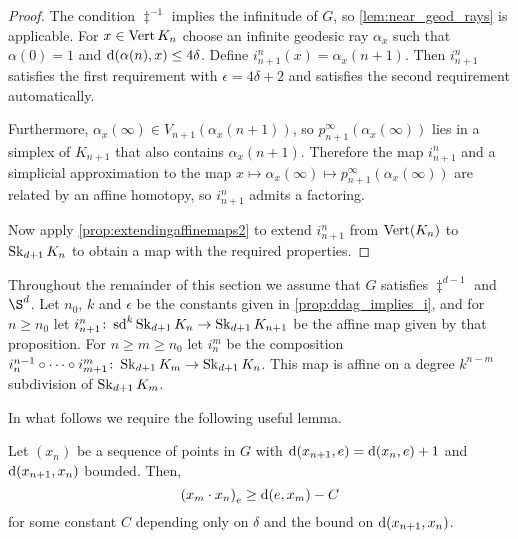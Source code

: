 \documentclass[a4paper]{article}
\begin{document}
\begin{proof}
  The condition $\ddag^{-1}$ implies the infinitude of $G$, so
  \cref{lem:near_geod_rays} is applicable. For $x \in \Vertices{K_n}$ choose an
  infinite geodesic ray $\alpha_x$ such that $\alpha(0) = 1$ and
  $\dist(\alpha(n), x) \leq 4\delta$. Define $i^n_{n+1}(x) =
  \alpha_x(n+1)$. Then $i^n_{n+1}$ satisfies the first requirement with
  $\epsilon = 4\delta+2$ and satisfies the second requirement automatically.

  Furthermore, $\alpha_x(\infty) \in V_{n+1}(\alpha_x(n+1))$, so 
  $p^\infty_{n+1}(\alpha_x(\infty))$ lies in a simplex of $K_{n+1}$ that also 
  contains $\alpha_x(n+1)$.  Therefore the map $i^n_{n+1}$ and a simplicial 
  approximation to the map $x \mapsto \alpha_x(\infty) \mapsto p^\infty_{n+1} 
  (\alpha_x(\infty))$ are related by an affine homotopy, so $i^n_{n+1}$ admits a 
  factoring. 

  Now apply \cref{prop:extendingaffinemaps2} to extend $i^n_{n+1}$ from
  $\Vertices(K_n)$ to $\Skel_{d+1} K_n$ to obtain a map with the required
  properties.
\end{proof}

Throughout the remainder of this section we assume that $G$ satisfies $\ddag^{d-1}$ 
and $\S^{d}$. Let $n_0$, $k$ and $\epsilon$ be the constants given in 
\cref{prop:ddag_implies_i}, and for $n\geq n_0$ let $i^n_{n+1} 
\from \sd^k\Skel_{d+1} K_n \to \Skel_{d+1} K_{n+1}$ be the affine map given by 
that proposition.  For $n \geq m \geq n_0$ let $i^m_n$ be the composition 
$i^{n-1}_n \composed \dotsb \composed i^m_{m+1} \from \Skel_{d+1} K_m \to 
\Skel_{d+1} K_n$.  This map is affine on a degree $k^{n-m}$ subdivision of 
$\Skel_{d+1} K_m$.

In what follows we require the following useful lemma.

\begin{lemma}\label{lem:useful}
  Let $(x_n)$ be a sequence of points in $G$ with $\dist(x_{n+1}, e) = 
  \dist(x_n, e) + 1$ and $\dist(x_{n+1}, x_n)$ bounded. Then,
  \begin{equation*}
    \gromov{e}{x_m}{x_n} \geq \dist(e,x_m) - C
  \end{equation*}
  for some constant $C$ depending only on $\delta$ and the bound on 
  $\dist(x_{n+1}, x_n)$.
\end{lemma}
\end{document}
